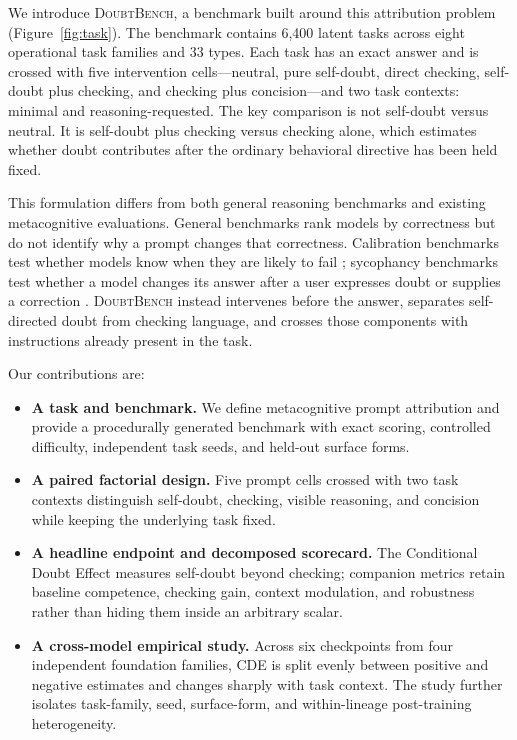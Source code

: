 \documentclass[sigconf]{acmart}
\newcommand{\bench}{\textsc{DoubtBench}}
\newcommand{\revision}[1]{\textcolor{revisionred}{#1}}
\begin{document}
We introduce \bench, a benchmark built around this attribution problem
(Figure~\ref{fig:task}). \revision{The benchmark contains 6,400 latent
tasks across eight operational task families and 33 types. Each task has an
exact answer and is crossed with five intervention cells---neutral, pure
self-doubt, direct checking, self-doubt plus checking, and checking plus
concision---and two task contexts: minimal and reasoning-requested. The key
comparison is not self-doubt versus neutral. It is self-doubt plus checking
versus checking alone, which estimates whether doubt contributes after the
ordinary behavioral directive has been held fixed.}

This formulation differs from both general reasoning benchmarks and existing
metacognitive evaluations. General benchmarks rank models by correctness but
do not identify why a prompt changes that correctness. Calibration benchmarks
test whether models know when they are likely to fail
\cite{wang2026mirror}; sycophancy benchmarks test whether a model changes its
answer after a user expresses doubt or supplies a correction
\cite{sinha2026sycobench}. \bench{} instead intervenes before the answer,
separates self-directed doubt from checking language, and crosses those
components with instructions already present in the task.

Our contributions are:
\begin{itemize}
  \item \textbf{A task and benchmark.} We define metacognitive prompt
  attribution and provide a procedurally generated benchmark with
  exact scoring, controlled difficulty, independent task seeds, and held-out
  surface forms.
  \item \textbf{A paired factorial design.} Five prompt cells crossed with two
  task contexts distinguish self-doubt, checking, visible reasoning, and
  concision while keeping the underlying task fixed.
  \item \textbf{A headline endpoint and decomposed scorecard.} The Conditional
  Doubt Effect measures self-doubt beyond checking; companion metrics retain
  baseline competence, checking gain, context modulation, and robustness
  rather than hiding them inside an arbitrary scalar.
  \item \revision{\textbf{A cross-model empirical study.} Across six
  checkpoints from four independent foundation families, CDE is split evenly
  between positive and negative estimates and changes sharply with task
  context. The study further isolates task-family, seed, surface-form, and
  within-lineage post-training heterogeneity.}
\end{itemize}
\end{document}
